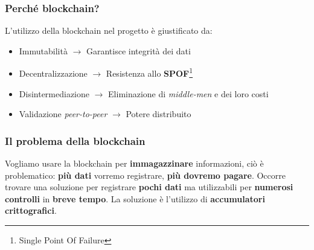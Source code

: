 \documentclass{beamer}
\begin{document}
\begin{frame}
	\frametitle{Perché blockchain?}
	L'utilizzo della blockchain nel progetto è giustificato da:
	\begin{itemize}%
		\item Immutabilità \(\rightarrow\) Garantisce integrità dei dati
		\item Decentralizzazione \(\rightarrow\) Resistenza allo \textbf{SPOF}\footnote{Single Point Of Failure}
		\item Disintermediazione \(\rightarrow\) Eliminazione di \emph{middle-men} e dei loro costi
		\item Validazione \emph{peer-to-peer} \(\rightarrow\) Potere distribuito
	\end{itemize}
\end{frame}

\begin{frame}
	\frametitle{Il problema della blockchain}
	Vogliamo usare la blockchain per
	\textbf{immagazzinare} informazioni,
	ciò è problematico: \textbf{più dati} vorremo registrare, \textbf{più
	dovremo pagare}.
	Occorre trovare una soluzione per registrare \textbf{pochi dati}
	ma utilizzabili per \textbf{numerosi controlli} in 
	\textbf{breve tempo}.
	La soluzione è l'utilizzo di \textbf{accumulatori crittografici}.
\end{frame}
\end{document}
